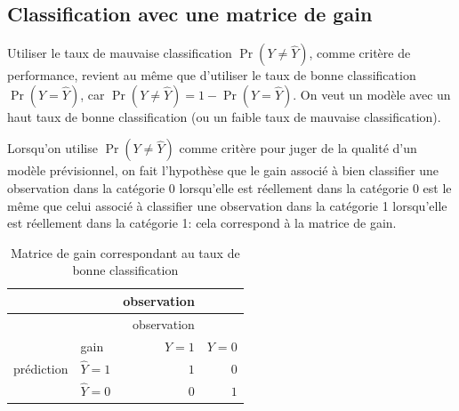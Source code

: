 \documentclass[
  11pt,
  letterpaper,
]{scrbook}
\newenvironment{Shaded}{\begin{snugshade}}{\end{snugshade}}
\newcommand{\AttributeTok}[1]{\textcolor[rgb]{0.40,0.45,0.13}{#1}}
\newcommand{\CommentTok}[1]{\textcolor[rgb]{0.37,0.37,0.37}{#1}}
\newcommand{\ConstantTok}[1]{\textcolor[rgb]{0.56,0.35,0.01}{#1}}
\newcommand{\DocumentationTok}[1]{\textcolor[rgb]{0.37,0.37,0.37}{\textit{#1}}}
\newcommand{\FunctionTok}[1]{\textcolor[rgb]{0.28,0.35,0.67}{#1}}
\newcommand{\NormalTok}[1]{\textcolor[rgb]{0.00,0.23,0.31}{#1}}
\newcommand{\OtherTok}[1]{\textcolor[rgb]{0.00,0.23,0.31}{#1}}
\newcommand{\SpecialCharTok}[1]{\textcolor[rgb]{0.37,0.37,0.37}{#1}}
\theoremstyle{definition}
\theoremstyle{remark}
\begin{document}
\begin{Shaded}
\end{Shaded}

\subsection{Classification avec une matrice de
gain}\label{classification-avec-une-matrice-de-gain}

Utiliser le taux de mauvaise classification \(\Pr(Y \neq \widehat{Y})\),
comme critère de performance, revient au même que d'utiliser le taux de
bonne classification \(\Pr(Y=\widehat{Y})\), car
\(\Pr(Y \neq \widehat{Y}) = 1-\Pr(Y=\widehat{Y})\). On veut un modèle
avec un haut taux de bonne classification (ou un faible taux de mauvaise
classification).

Lorsqu'on utilise \(\Pr(Y \neq \widehat{Y})\) comme critère pour juger
de la qualité d'un modèle prévisionnel, on fait l'hypothèse que le gain
associé à bien classifier une observation dans la catégorie 0
lorsqu'elle est réellement dans la catégorie 0 est le même que celui
associé à classifier une observation dans la catégorie 1 lorsqu'elle est
réellement dans la catégorie 1: cela correspond à la matrice de gain.

\begin{longtable}[]{@{}llrr@{}}
\caption{Matrice de gain correspondant au taux de bonne
classification}\label{tbl-03-gain1}\tabularnewline
\toprule\noalign{}
& & observation & \\
\midrule\noalign{}
\endfirsthead
\toprule\noalign{}
& & observation & \\
\midrule\noalign{}
\endhead
\bottomrule\noalign{}
\endlastfoot
& gain & \(Y=1\) & \(Y=0\) \\
prédiction & \(\widehat{Y}=1\) & \(1\) & \(0\) \\
& \(\widehat{Y}=0\) & \(0\) & \(1\) \\
\end{longtable}
\end{document}
